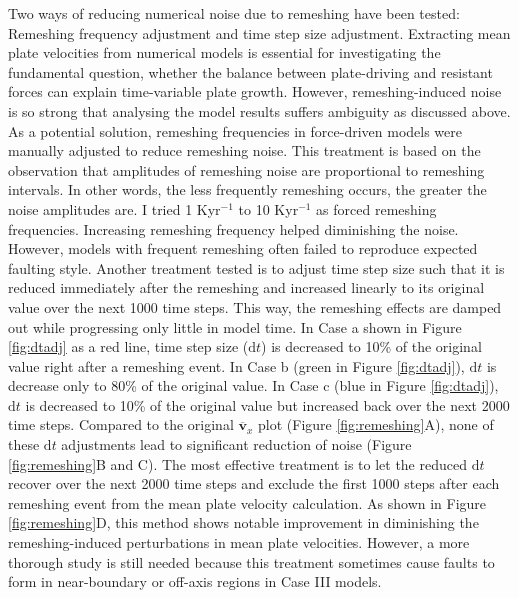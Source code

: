 \documentclass[letterpaper,12pt,notitle]{memphisthesis}                     %
\begin{document}
Two ways of reducing numerical noise due to remeshing have been tested: Remeshing frequency adjustment and time step size adjustment.
Extracting mean plate velocities from numerical models is essential for investigating the fundamental question, whether the balance between plate-driving and resistant forces can explain time-variable plate growth. However, remeshing-induced noise is so strong that analysing the model results suffers ambiguity as discussed above. As a potential solution, remeshing frequencies in force-driven models were manually adjusted to reduce remeshing noise. This treatment is based on the observation that amplitudes of remeshing noise %
are proportional to remeshing intervals. In other words, the less frequently remeshing occurs, the greater the noise amplitudes are. I tried 1 Kyr$^{-1}$ to 10 Kyr$^{-1}$ as forced remeshing frequencies. Increasing remeshing frequency helped diminishing the noise. However, models with frequent remeshing often failed to reproduce expected faulting style. Another treatment tested is to adjust time step size such that it is reduced immediately after the remeshing and increased linearly to its original value over the next 1000 time steps. This way, the remeshing effects are damped out while progressing only little in model time. In Case a shown in Figure \ref{fig:dtadj} as a red line, time step size ($\text{d}t$) is decreased to 10\% of the original value right after a remeshing event. In Case b (green in Figure \ref{fig:dtadj}), $\text{d}t$ is decrease only to 80\% of the original value. In Case c (blue in Figure \ref{fig:dtadj}), $\text{d}t$ is decreased to 10\% of the original value but increased back over the next 2000 time steps. Compared to the original $\overline{\boldsymbol{v}}_{x}$ plot (Figure \ref{fig:remeshing}A), none of these $\text{d}t$ adjustments lead to significant reduction of noise (Figure \ref{fig:remeshing}B and C). %
The most effective treatment is to let the reduced $\text{d}t$ recover over the next 2000 time steps and exclude the first 1000 steps after each remeshing event from the mean plate velocity calculation. As shown in Figure \ref{fig:remeshing}D, this method shows notable improvement in diminishing the remeshing-induced perturbations in mean plate velocities. However, a more thorough study is still needed because this treatment sometimes cause faults to form in near-boundary or off-axis regions in Case III models.
%
\end{document}
